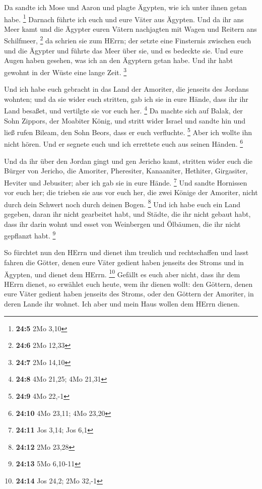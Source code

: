  Da sandte ich Mose und Aaron und plagte Ägypten, wie ich
unter ihnen getan habe. \footnote{\textbf{24:5} 2Mo 3,10} 
Darnach führte ich euch und eure Väter aus Ägypten. Und da ihr ans Meer
kamt und die Ägypter euren Vätern nachjagten mit Wagen und Reitern ans
Schilfmeer, \footnote{\textbf{24:6} 2Mo 12,33}  da schrien
sie zum HErrn; der setzte eine Finsternis zwischen euch und die Ägypter
und führte das Meer über sie, und es bedeckte sie. Und eure Augen haben
gesehen, was ich an den Ägyptern getan habe. Und ihr habt gewohnt in der
Wüste eine lange Zeit. \footnote{\textbf{24:7} 2Mo 14,10}

 Und ich habe euch gebracht in das Land der Amoriter, die
jenseits des Jordans wohnten; und da sie wider euch stritten, gab ich
sie in eure Hände, dass ihr ihr Land besaßet, und vertilgte sie vor euch
her. \footnote{\textbf{24:8} 4Mo 21,25; 4Mo 21,31}  Da
machte sich auf Balak, der Sohn Zippors, der Moabiter König, und stritt
wider Israel und sandte hin und ließ rufen Bileam, den Sohn Beors, dass
er euch verfluchte. \footnote{\textbf{24:9} 4Mo 22,-1} 
Aber ich wollte ihn nicht hören. Und er segnete euch und ich errettete
euch aus seinen Händen. \footnote{\textbf{24:10} 4Mo 23,11; 4Mo 23,20}

 Und da ihr über den Jordan gingt und gen Jericho kamt,
stritten wider euch die Bürger von Jericho, die Amoriter, Pheresiter,
Kanaaniter, Hethiter, Girgasiter, Heviter und Jebusiter; aber ich gab
sie in eure Hände. \footnote{\textbf{24:11} Jos 3,14; Jos 6,1}
 Und sandte Hornissen vor euch her; die trieben sie aus
vor euch her, die zwei Könige der Amoriter, nicht durch dein Schwert
noch durch deinen Bogen. \footnote{\textbf{24:12} 2Mo 23,28}
 Und ich habe euch ein Land gegeben, daran ihr nicht
gearbeitet habt, und Städte, die ihr nicht gebaut habt, dass ihr darin
wohnt und esset von Weinbergen und Ölbäumen, die ihr nicht gepflanzt
habt. \footnote{\textbf{24:13} 5Mo 6,10-11}

 So fürchtet nun den HErrn und dienet ihm treulich und
rechtschaffen und lasst fahren die Götter, denen eure Väter gedient
haben jenseits des Stroms und in Ägypten, und dienet dem HErrn.
\footnote{\textbf{24:14} Jos 24,2; 2Mo 32,-1}  Gefällt es
euch aber nicht, dass ihr dem HErrn dienet, so erwählet euch heute, wem
ihr dienen wollt: den Göttern, denen eure Väter gedient haben jenseits
des Stroms, oder den Göttern der Amoriter, in deren Lande ihr wohnet.
Ich aber und mein Haus wollen dem HErrn dienen.

